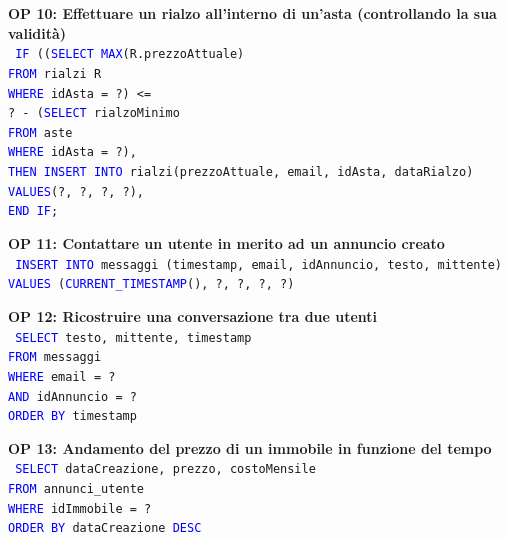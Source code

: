 \documentclass[a4paper,12pt]{report}
\begin{document}
            \newpage
            \noindent
            \textbf{OP 10: Effettuare un rialzo all’interno di un’asta (controllando la sua validità)} \\
            \texttt{
                \textcolor{blue}{IF} ((\textcolor{blue}{SELECT MAX}(R.prezzoAttuale) \\
                    \null\qquad \textcolor{blue}{FROM} rialzi R\\
                    \null\qquad \textcolor{blue}{WHERE} idAsta = ?) <= \\
                    \null\qquad ? - (\textcolor{blue}{SELECT} rialzoMinimo \\
                    \null\qquad \textcolor{blue}{FROM} aste \\
                    \null\qquad \textcolor{blue}{WHERE} idAsta = ?), \\
                \textcolor{blue}{THEN INSERT INTO} rialzi(prezzoAttuale, email, idAsta, dataRialzo) \\
                \textcolor{blue}{VALUES}(?, ?, ?, ?), \\ 
                \textcolor{blue}{END IF}; \\
            }       
            
            \noindent
            \textbf{OP 11: Contattare un utente in merito ad un annuncio creato} \\
            \texttt{
                \textcolor{blue}{INSERT INTO} messaggi (timestamp, email, idAnnuncio, testo, mittente) \\
                \textcolor{blue}{VALUES} (\textcolor{blue}{CURRENT\_TIMESTAMP}(), ?, ?, ?, ?) \\
            } 

            \noindent
            \textbf{OP 12: Ricostruire una conversazione tra due utenti} \\
            \texttt{
                \textcolor{blue}{SELECT} testo, mittente, timestamp \\
                \textcolor{blue}{FROM} messaggi \\
                \textcolor{blue}{WHERE} email = ? \\
                \textcolor{blue}{AND} idAnnuncio = ? \\
                \textcolor{blue}{ORDER BY} timestamp \\
            }

            \noindent
            \textbf{OP 13: Andamento del prezzo di un immobile in funzione del tempo} \\
            \texttt{
                \textcolor{blue}{SELECT} dataCreazione, prezzo, costoMensile \\
                \textcolor{blue}{FROM} annunci\_utente \\
                \textcolor{blue}{WHERE} idImmobile = ? \\
                \textcolor{blue}{ORDER BY} dataCreazione \textcolor{blue}{DESC} \\
            }
            
\end{document}
